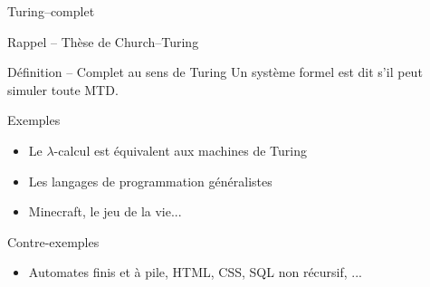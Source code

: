 
\begingroup

\begin{frame}{Turing--complet}

  \begin{block}{Rappel -- Thèse de Church--Turing}
    \begin{center}
    \end{center}
  \end{block}

  \begin{block}{Définition -- Complet au sens de Turing}
    Un système formel est dit  s'il peut \og simuler \fg toute MTD.
  \end{block}

  \begin{exampleblock}{Exemples}
    \begin{itemize}
    \item Le $\lambda$-calcul est équivalent aux machines de Turing
    \item Les langages de programmation généralistes
    \item Minecraft, le jeu de la vie...
    \end{itemize}
  \end{exampleblock}

  \begin{alertblock}{Contre-exemples}
    \begin{itemize}
    \item Automates finis et à pile, HTML, CSS, SQL non récursif, ...
    \end{itemize}
  \end{alertblock}
  
\end{frame}

\endgroup
\endinput
